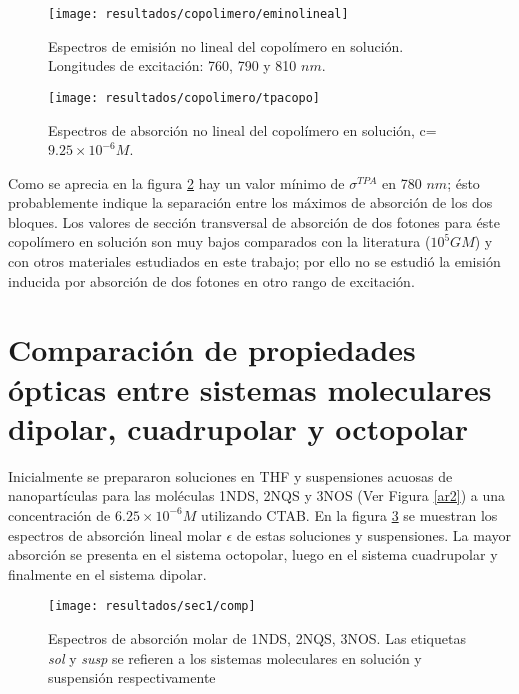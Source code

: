 \begin{figure}[h]
\centering
\texttt{[image: resultados/copolimero/eminolineal]}
\caption{Espectros de emisi\'on no lineal del copol\'imero en soluci\'on. Longitudes de excitaci\'on: 760, 790 y 810 $nm$.}\label{nolinealejemplos}
\end{figure}



\begin{figure}[H]
\centering
\texttt{[image: resultados/copolimero/tpacopo]}
\caption{Espectros de absorci\'on no lineal del copol\'imero en soluci\'on, c=$9.25 \times 10 ^{-6} M$.}\label{sigmacopo}
\end{figure}

Como se aprecia en la figura \ref{sigmacopo} hay un valor m\'inimo de $\sigma ^{TPA}$ en 780 $nm$; \'esto probablemente indique la separaci\'on entre los m\'aximos de absorci\'on de los dos bloques. Los valores de secci\'on transversal de absorci\'on de dos fotones para \'este copol\'imero en soluci\'on son muy bajos comparados con la literatura ($10^5 GM$) y con otros materiales estudiados en este trabajo; por ello no se estudi\'o la emisi\'on inducida por absorci\'on de dos fotones en otro rango de excitaci\'on. 
 
 
 


\section{Comparaci\'on de propiedades \'opticas entre sistemas moleculares dipolar, cuadrupolar y octopolar}

Inicialmente se prepararon soluciones en THF y suspensiones acuosas de nanopart\'iculas para las mol\'eculas 1NDS, 2NQS y 3NOS (Ver Figura \ref{ar2}) a una concentraci\'on de $6.25 \times 10^{-6} M$ utilizando CTAB. En la figura \ref{X} se muestran los espectros de absorci\'on lineal molar $\epsilon$ de estas soluciones y suspensiones. La mayor absorci\'on se presenta en el sistema octopolar, luego en el sistema cuadrupolar y finalmente en el sistema dipolar. 

\begin{figure}[h]
\centering
\texttt{[image: resultados/sec1/comp]}
\caption{Espectros de absorci\'on molar de 1NDS, 2NQS, 3NOS. Las etiquetas \emph{sol} y \emph{susp} se refieren a los sistemas moleculares en soluci\'on y suspensi\'on respectivamente}\label{X}
\end{figure}


